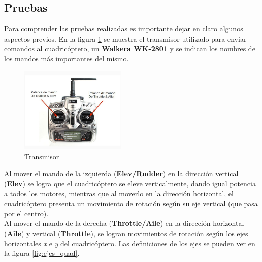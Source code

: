 \documentclass[spanish,12pt,a4paper,titlepage]{report}
\begin{document}
\subsection*{Pruebas}

Para comprender las pruebas realizadas es importante dejar en claro algunos aspectos previos. En la figura \ref{fig:tx} se muestra el transmisor utilizado para enviar comandos al cuadricóptero, un \textbf{Walkera WK-2801} y se indican los nombres de los mandos más importantes del mismo.


\begin{figure}
	\vspace{-20pt}
	\begin{center}
	\includegraphics[width=0.45\textwidth]{./pics/tx.jpg}
	\end{center}
	\vspace{-25pt}
	\caption{Transmisor}
	\label{fig:tx}
	\vspace{20pt}
\end{figure}

Al mover el mando de la izquierda (\textbf{Elev/Rudder}) en la dirección vertical (\textbf{Elev}) se logra que el cuadricóptero se eleve verticalmente, dando igual potencia a todos los motores, mientras que al moverlo en la dirección horizontal, el cuadricóptero presenta un movimiento de rotación según su eje vertical (que pasa por el centro).\\

Al mover el mando de la derecha (\textbf{Throttle/Aile}) en la dirección horizontal (\textbf{Aile}) y vertical (\textbf{Throttle}), se logran movimientos de rotación según los ejes horizontales \emph{x} e \emph{y} del cuadricóptero. Las definiciones de los ejes se pueden ver en la figura \ref{fig:ejes_quad}.\\
\end{document}

